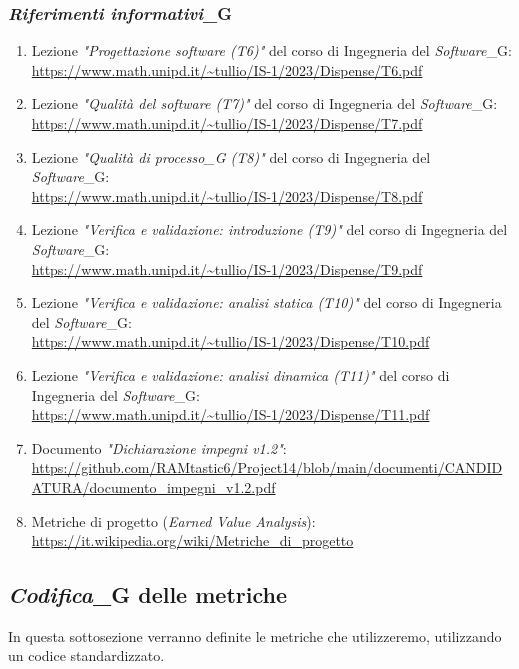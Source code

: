 \subsubsection{\textit{Riferimenti informativi}_G}
\label{sec:rif_inf}
\begin{enumerate}
    \item Lezione \emph{"Progettazione software (T6)"} del corso di Ingegneria del \textit{Software}_G: \\
    \url{https://www.math.unipd.it/~tullio/IS-1/2023/Dispense/T6.pdf}
    \item Lezione \emph{"Qualità del software (T7)"} del corso di Ingegneria del \textit{Software}_G: \\
    \url{https://www.math.unipd.it/~tullio/IS-1/2023/Dispense/T7.pdf}
    \item Lezione \emph{"\textit{Qualità di processo}_G (T8)"} del corso di Ingegneria del \textit{Software}_G: \\
    \url{https://www.math.unipd.it/~tullio/IS-1/2023/Dispense/T8.pdf}
    \item Lezione \emph{"Verifica e validazione: introduzione (T9)"} del corso di Ingegneria del \textit{Software}_G: \\
    \url{https://www.math.unipd.it/~tullio/IS-1/2023/Dispense/T9.pdf}
    \item Lezione \emph{"Verifica e validazione: analisi statica (T10)"} del corso di Ingegneria del \textit{Software}_G: \\
    \url{https://www.math.unipd.it/~tullio/IS-1/2023/Dispense/T10.pdf}
    \item Lezione \emph{"Verifica e validazione: analisi dinamica (T11)"} del corso di Ingegneria del \textit{Software}_G: \\
    \url{https://www.math.unipd.it/~tullio/IS-1/2023/Dispense/T11.pdf}
     \item Documento \emph{"Dichiarazione impegni v1.2"}: \\ \url{https://github.com/RAMtastic6/Project14/blob/main/documenti/CANDIDATURA/documento_impegni_v1.2.pdf}
     \item Metriche di progetto (\emph{Earned Value Analysis}):\\
     \url{https://it.wikipedia.org/wiki/Metriche_di_progetto}
\end{enumerate}
\subsection{\textit{Codifica}_G delle metriche}
In questa sottosezione verranno definite le metriche che utilizzeremo, utilizzando un codice standardizzato.

